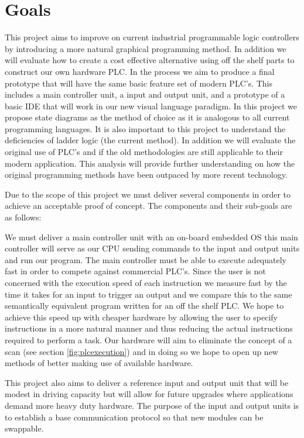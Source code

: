 \section{Goals}

This project aims to improve on current industrial programmable logic controllers by introducing a more natural graphical programming method. In addition we will evaluate how to create a cost effective alternative using off the shelf parts to construct our own hardware PLC. In the process we aim to produce a final prototype that will have the same basic feature set of modern PLC's. This includes a main controller unit, a input and output unit, and a prototype of a basic IDE that will work in our new visual language paradigm. In this project we propose state diagrams as the method of choice as it is analogous to all current programming languages. It is also important to this project to understand the deficiencies of ladder logic (the current method). In addition we will evaluate the original use of PLC's and if the old methodologies are still applicable to their modern application. This analysis will provide further understanding on how the original programming methods have been outpaced by more recent technology.

Due to the scope of this project we must deliver several components in order to achieve an acceptable proof of concept. The components and their sub-goals are as follows:

We must deliver a main controller unit with an on-board embedded OS this main controller will serve as our CPU sending commands to the input and output units and run our program. The main controller must be able to execute adequately fast in order to compete against commercial PLC's. Since the user is not concerned with the execution speed of each instruction we measure fast by the time it takes for an input to trigger an output and we compare this to the same semantically equivalent program written for an off the shelf PLC. We hope to achieve this speed up with cheaper hardware by allowing the user to specify instructions in a more natural manner and thus reducing the actual instructions required to perform a task. Our hardware will aim to eliminate the concept of a scan (see section \ref{fig:plcexecution}) and in doing so we hope to open up new methods of better making use of available hardware.

This project also aims to deliver a reference input and output unit that will be modest in driving capacity but will allow for future upgrades where applications demand more heavy duty hardware. The purpose of the input and output units is to establish a base communication protocol so that new modules can be swappable.

